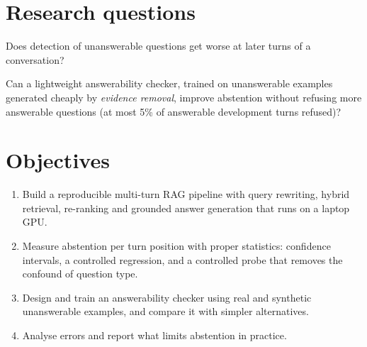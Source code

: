 \documentclass[11pt,a4paper]{report}
\begin{document}
\section{Research questions}
\begin{description}[leftmargin=1.2em,style=nextline]
\item[RQ1 -- Abstention drift] Does detection of unanswerable questions get worse at later turns of a conversation?
\item[RQ2 -- A cheap fix] Can a lightweight answerability checker, trained on unanswerable examples generated cheaply by \emph{evidence removal}, improve abstention without refusing more answerable questions (at most 5\% of answerable development turns refused)?
\end{description}

\section{Objectives}
\begin{enumerate}
\item Build a reproducible multi-turn RAG pipeline with query rewriting, hybrid retrieval, re-ranking and grounded answer generation that runs on a laptop GPU.
\item Measure abstention per turn position with proper statistics: confidence intervals, a controlled regression, and a controlled probe that removes the confound of question type.
\item Design and train an answerability checker using real and synthetic unanswerable examples, and compare it with simpler alternatives.
\item Analyse errors and report what limits abstention in practice.
\end{enumerate}
\end{document}
